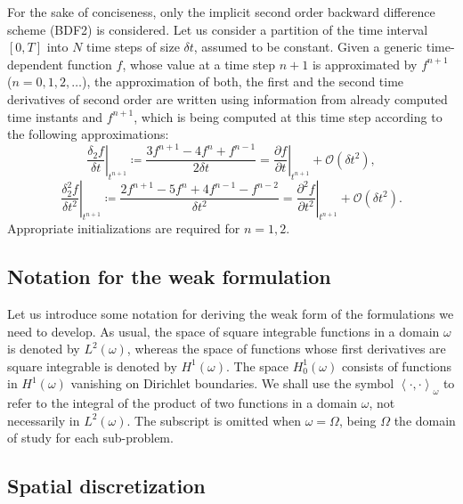 \documentclass[11pt,english]{article}
\begin{document}
For the sake of conciseness, only the implicit second order backward difference scheme (BDF2) is considered. Let us consider a partition of the time interval $[0,T]$ into $N$ time steps of size $\delta t$, assumed to be constant. Given a generic time-dependent function $f$, whose value at a time step $n+1$ is approximated by $f^{n+1}$ ($n=0,1,2,\dots$), the approximation of both, the first and the second time derivatives of second order are written using information from already computed time instants and $f^{n+1}$, which is being computed at this time step according to the following approximations:
\begin{equation*}
 \left.\frac{\delta_2 f}{\delta t}\right\vert _{t^{n+1}} \coloneqq\frac{3f^{n+1}-4f^{n}+f^{n-1}}{2\delta t} =
    \left.\frac{\partial f}{\partial t}\right\vert _{t^{n+1}} +\mathcal{O}(\delta t^{2}),
\end{equation*}
\begin{equation*}
\left.\frac{\delta_2^2 f}{\delta t^2}\right\vert _{t^{n+1}} \coloneqq \frac{2f^{n+1}-5f^{n}+4f^{n-1}-f^{n-2}}{\delta t^2} = 
    \left.\frac{\partial^2 f}{\partial t^2}\right\vert _{t^{n+1}} +\mathcal{O}(\delta t^{2}).
\end{equation*}
Appropriate initializations are required for $n=1,2$.

\subsection{Notation for the weak formulation\label{subsec:preliminaries_weakformulation}}

Let us introduce some notation for deriving the weak form of the formulations we need to develop. As usual, the space of square integrable functions in a domain $\omega$ is denoted by $L^2\left(\omega\right)$, whereas the space of functions whose first derivatives are square integrable is denoted by $H^1\left(\omega\right)$. The space $H^1_0\left(\omega\right)$ consists of functions in $H^1\left(\omega\right)$ vanishing on Dirichlet boundaries. We shall use the symbol $\left \langle \cdot , \cdot  \right \rangle_\omega$ to refer to the integral of the product of two functions in a domain $\omega$, not necessarily in $L^2(\omega)$. The subscript is omitted when $\omega = \Omega$, being $\Omega$ the domain of study for each sub-problem.

\subsection{Spatial discretization\label{subsec:preliminaries_galerkin}}
\end{document}
